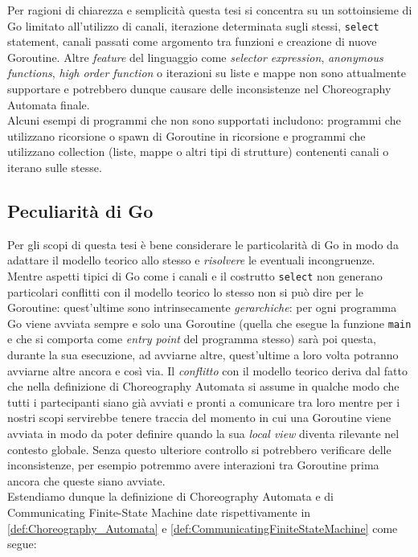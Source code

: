 Per ragioni di chiarezza e semplicità questa tesi si concentra su un sottoinsieme di Go limitato all'utilizzo di canali, iterazione determinata sugli stessi, \texttt{select} statement, canali passati come argomento tra funzioni e creazione di nuove Goroutine. Altre \emph{feature} del linguaggio come \emph{selector expression}, \emph{anonymous functions}, \emph{high order function} o iterazioni su liste e mappe non sono attualmente supportare e potrebbero dunque causare delle inconsistenze nel Choreography Automata finale. \\
Alcuni esempi di programmi che non sono supportati includono: programmi che utilizzano ricorsione o spawn di Goroutine in ricorsione e programmi che utilizzano collection (liste, mappe o altri tipi di strutture) contenenti canali o iterano sulle stesse. \\

\subsection{Peculiarità di Go}
Per gli scopi di questa tesi è bene considerare le particolarità di Go in modo da adattare il modello teorico allo stesso e \emph{risolvere} le eventuali incongruenze.\bigskip \\
Mentre aspetti tipici di Go come i canali e il costrutto \texttt{select} non generano particolari conflitti con il modello teorico lo stesso non si può dire per le Goroutine: quest'ultime sono intrinsecamente \emph{gerarchiche}: per ogni programma Go viene avviata sempre e solo una Goroutine (quella che esegue la funzione \texttt{main} e che si comporta come \emph{entry point} del programma stesso) sarà poi questa, durante la sua esecuzione, ad avviarne altre, quest'ultime a loro volta potranno avviarne altre ancora e così via.
Il \emph{conflitto} con il modello teorico deriva dal fatto che nella definizione di Choreography Automata si assume in qualche modo che tutti i partecipanti siano già avviati e pronti a comunicare tra loro mentre per i nostri scopi servirebbe tenere traccia del momento in cui una Goroutine viene avviata in modo da poter definire quando la sua \emph{local view} diventa rilevante nel contesto globale. Senza questo ulteriore controllo si potrebbero verificare delle inconsistenze, per esempio potremmo avere interazioni tra Goroutine prima ancora che queste siano avviate.\bigskip \\
Estendiamo dunque la definizione di Choreography Automata e di Communicating Finite-State Machine date rispettivamente in \ref{def:Choreography_Automata} e \ref{def:CommunicatingFiniteStateMachine} come segue:


